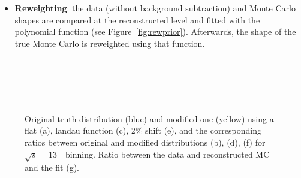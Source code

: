 \begin{itemize}
\item \textbf{Reweighting}:  the data (without background subtraction) and Monte Carlo shapes are compared at the reconstructed level and fitted with the polynomial function (see Figure~\ref{fig:rewprior}). Afterwards, the shape of the true Monte Carlo is reweighted using that function.
\end{itemize}

\begin{figure}[h]
\centering
{}
\\
\\
\\
\\
\caption{ Original truth distribution (blue) and modified one (yellow) using a flat (a), landau function (c),  2\% shift (e),  and the corresponding ratios between original and modified distributions (b), (d), (f) for $\sqrt{s} = 13$~\TeV\ binning. Ratio between the data and reconstructed MC and the fit (g). }\end{figure}

